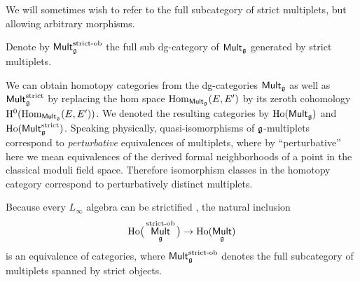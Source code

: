 \documentclass[pdftex]{sigma}
\numberwithin{equation}{section}
\def\cat#1{\ensuremath{\mathsf{#1}}}
\DeclareMathOperator{\Mult}{\cat{Mult}}
\DeclareMathOperator{\Hom}{Hom}
\begin{document}
We will sometimes wish to refer to the full subcategory of strict multiplets, but allowing arbitrary morphisms.
\begin{dfn}
	Denote by $\Mult_{\fg}^{\text{\rm strict-ob}}$ the full sub dg-category of $\Mult_{\fg}$ generated by strict multiplets.
\end{dfn}


We can obtain homotopy categories from the dg-categories $\Mult_{\fg}$ as well as $\Mult_{\fg}^{\mathrm{strict}}$ by replacing the hom space $\Hom_{\Mult_{\fg}}(E, E')$ by its zeroth cohomology $\mathrm H^0(\mathrm{Hom}_{\Mult_{\fg}}(E, E'))$. We denoted the resulting categories by $\mathrm{Ho}(\Mult_{\fg})$ and $\mathrm{Ho}(\Mult_{\fg}^{\mathrm{strict}})$. Speaking physically, quasi-isomorphisms of $\mathfrak g$-multiplets correspond to \emph{perturbative} equivalences of multiplets, where by ``perturbative'' here we mean equivalences of the derived formal neighborhoods of a point in the classical moduli field space. Therefore isomorphism classes in the homotopy category correspond to perturbatively distinct multiplets.


\begin{rmk}
	Because every $L_\infty$ algebra can be strictified \cite[Part II, Corollary 1.6]{KrizMay}, the natural inclusion
	\begin{equation*}
	\mathrm{Ho}\big(\Mult_{\fg}^{\text{\rm strict-ob}}\big) \to \mathrm{Ho}(\Mult_{\fg})
	\end{equation*}
	is an equivalence of categories, where $\Mult_{\fg}^{\text{\rm strict-ob}}$ denotes the full subcategory of multiplets spanned by strict objects.
\end{rmk}
\end{document}
